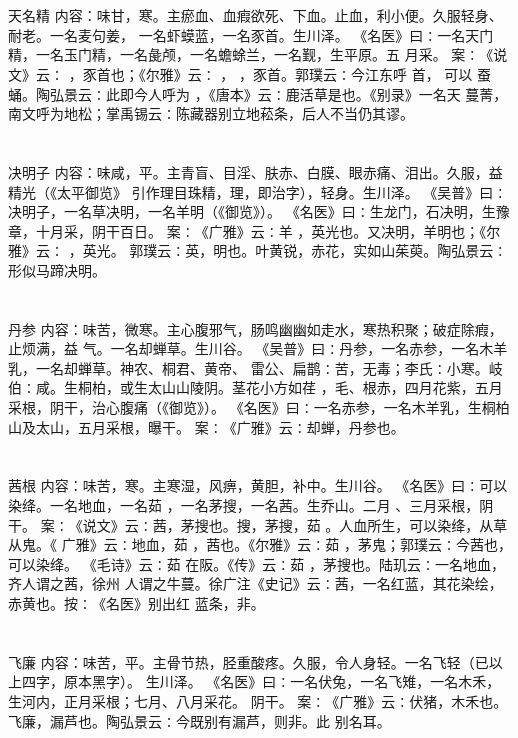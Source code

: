 \documentclass[12pt,UTF8]{ctexbook}
\begin{document}
\chapter{}天名精
内容：味甘，寒。主瘀血、血瘕欲死、下血。止血，利小便。久服轻身、耐老。一名麦句姜， 
一名虾蟆蓝，一名豕首。生川泽。 
《名医》曰∶一名天门精，一名玉门精，一名彘颅，一名蟾蜍兰，一名觐，生平原。五 
月采。 
案∶《说文》云∶ ，豕首也；《尔雅》云∶ ， ，豕首。郭璞云∶今江东呼 首， 
可以 蚕蛹。陶弘景云∶此即今人呼为 ，《唐本》云∶鹿活草是也。《别录》一名天 
蔓菁，南文呼为地松；掌禹锡云∶陈藏器别立地菘条，后人不当仍其谬。 


\chapter{}决明子
内容：味咸，平。主青盲、目淫、肤赤、白膜、眼赤痛、泪出。久服，益精光（《太平御览》 
引作理目珠精，理，即治字），轻身。生川泽。 
《吴普》曰∶决明子，一名草决明，一名羊明（《御览》）。 
《名医》曰∶生龙门，石决明，生豫章，十月采，阴干百日。 
案∶《广雅》云∶羊 ，英光也。又决明，羊明也；《尔雅》云∶ ，英光。 
郭璞云∶英，明也。叶黄锐，赤花，实如山茱萸。陶弘景云∶形似马蹄决明。 


\chapter{}丹参
内容：味苦，微寒。主心腹邪气，肠鸣幽幽如走水，寒热积聚；破症除瘕，止烦满，益 
气。一名却蝉草。生川谷。 
《吴普》曰∶丹参，一名赤参，一名木羊乳，一名却蝉草。神农、桐君、黄帝、 
雷公、扁鹊∶苦，无毒；李氏∶小寒。岐伯∶咸。生桐柏，或生太山山陵阴。茎花小方如荏 
，毛、根赤，四月花紫，五月采根，阴干，治心腹痛（《御览》）。 
《名医》曰∶一名赤参，一名木羊乳，生桐柏山及太山，五月采根，曝干。 
案∶《广雅》云∶却蝉，丹参也。 


\chapter{}茜根
内容：味苦，寒。主寒湿，风痹，黄胆，补中。生川谷。 
《名医》曰∶可以染绛。一名地血，一名茹 ，一名茅搜，一名茜。生乔山。二月 
、三月采根，阴干。 
案∶《说文》云∶茜，茅搜也。搜，茅搜，茹 。人血所生，可以染绛，从草从鬼。《 
广雅》云∶地血，茹 ，茜也。《尔雅》云∶茹 ，茅鬼；郭璞云∶今茜也，可以染绛。 
《毛诗》云∶茹 在阪。《传》云∶茹 ，茅搜也。陆玑云∶一名地血，齐人谓之茜，徐州 
人谓之牛蔓。徐广注《史记》云∶茜，一名红蓝，其花染绘，赤黄也。按∶《名医》别出红 
蓝条，非。 


\chapter{}飞廉
内容：味苦，平。主骨节热，胫重酸疼。久服，令人身轻。一名飞轻（已以上四字，原本黑字）。 
生川泽。 
《名医》曰∶一名伏兔，一名飞雉，一名木禾，生河内，正月采根；七月、八月采花。 
阴干。 
案∶《广雅》云∶伏猪，木禾也。飞廉，漏芦也。陶弘景云∶今既别有漏芦，则非。此 
别名耳。 
\end{document}
